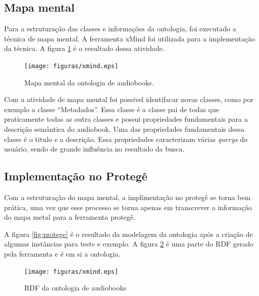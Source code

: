 \subsection{Mapa mental}

Para a estruturação das classes e informações da ontologia, foi executado a técnica de mapa mental. A ferramenta xMind foi utilizada para a implementação da técnica. A figura \ref{fig:xmind} é o resultado dessa atividade.

\begin{figure}[H]
  \centering
    \texttt{[image: figuras/xmind.eps]}
  \caption{Mapa mental da ontologia de audiobooks.}
  \label{fig:xmind}
\end{figure}

Com a atividade de mapa mental foi possivel identifacar novas classes, como por exemplo a classe “Metadados”. Essa classe é a classe pai de todas que praticamente todas as outra classes e possui propriedades fundamentais para a descrição semântica do audiobook. Uma das propriedades fundamentais dessa classe é o titulo e a descrição. Essa propriedades caracterizam várias \textit{querys} do usuário, sendo de grande influência no resultado da busca.

\subsection{Implementação no Protegê}

Com a estruturação do mapa mental, a implimentação no protegê se torna bem prática, uma vez que esse processo se torna apenas em transcrever a informação do mapa metal para a ferramenta protegê. 

A figura \ref{fig:protege} é o resultado da modelagem da ontologia após a criação de algumas instâncias para teste e exemplo. A figura \ref{fig:rdf} é uma parte do RDF gerado pela ferramenta e é em si a ontologia.

\begin{figure}[H]
  \centering
    \texttt{[image: figuras/xmind.eps]}
  \caption{RDF da ontologia de audiobooks}
  \label{fig:rdf}
\end{figure}




